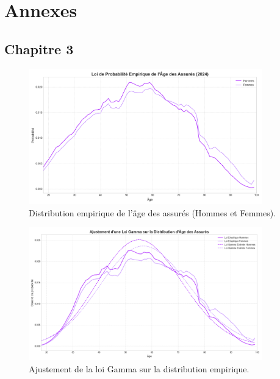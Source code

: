 \chapter*{Annexes}

\section*{Chapitre 3}


\begin{figure}[H]
\centering
\includegraphics[width=0.9\textwidth]{images/2_chapitres/chapitre3/distribution_age_assures.png}
\caption{Distribution empirique de l'âge des assurés (Hommes et Femmes).}
\label{fig:empirique}
\end{figure}

\begin{figure}[H]
\centering
\includegraphics[width=0.9\textwidth]{images/2_chapitres/chapitre3/estimation_loi_gamma.png}
\caption{Ajustement de la loi Gamma sur la distribution empirique.}
\label{fig:gamma}
\end{figure}

